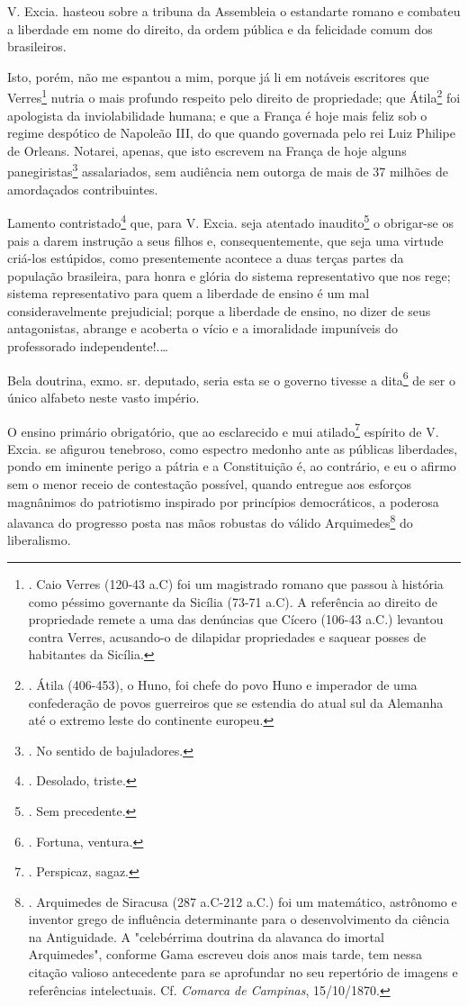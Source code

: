 V. Excia. hasteou sobre a tribuna da Assembleia o estandarte romano e
combateu a liberdade em nome do direito, da ordem pública e da
felicidade comum dos brasileiros.

Isto, porém, não me espantou a mim, porque já li em notáveis escritores
que Verres\footnote{. Caio Verres (120-43 a.C) foi um magistrado romano
  que passou à história como péssimo governante da Sicília (73-71 a.C).
  A referência ao direito de propriedade remete a uma das denúncias que
  Cícero (106-43 a.C.) levantou contra Verres, acusando-o de dilapidar
  propriedades e saquear posses de habitantes da Sicília.} nutria o mais
profundo respeito pelo direito de propriedade; que Átila\footnote{.
  Átila (406-453), o Huno, foi chefe do povo Huno e imperador de uma
  confederação de povos guerreiros que se estendia do atual sul da
  Alemanha até o extremo leste do continente europeu.} foi apologista da
inviolabilidade humana; e que a França é hoje mais feliz sob o regime
despótico de Napoleão III, do que quando governada pelo rei Luiz Philipe
de Orleans. Notarei, apenas, que isto escrevem na França de hoje alguns
panegiristas\footnote{. No sentido de bajuladores.} assalariados, sem
audiência nem outorga de mais de 37 milhões de amordaçados
contribuintes.

Lamento contristado\footnote{. Desolado, triste.} que, para V. Excia.
seja atentado inaudito\footnote{. Sem precedente.} o obrigar-se os pais
a darem instrução a seus filhos e, consequentemente, que seja uma
virtude criá-los estúpidos, como presentemente acontece a duas terças
partes da população brasileira, para honra e glória do sistema
representativo que nos rege; sistema representativo para quem a
liberdade de ensino é um mal consideravelmente prejudicial; porque a
liberdade de ensino, no dizer de seus antagonistas, abrange e acoberta o
vício e a imoralidade impuníveis do professorado independente!.\ldots{}

Bela doutrina, exmo. sr. deputado, seria esta se o governo tivesse a
dita\footnote{. Fortuna, ventura.} de ser o único alfabeto neste vasto
império.

O ensino primário obrigatório, que ao esclarecido e mui
atilado\footnote{. Perspicaz, sagaz.} espírito de V. Excia. se afigurou
tenebroso, como espectro medonho ante as públicas liberdades, pondo em
iminente perigo a pátria e a Constituição é, ao contrário, e eu o afirmo
sem o menor receio de contestação possível, quando entregue aos esforços
magnânimos do patriotismo inspirado por princípios democráticos, a
poderosa alavanca do progresso posta nas mãos robustas do válido
Arquimedes\footnote{. Arquimedes de Siracusa (287 a.C-212 a.C.) foi um
  matemático, astrônomo e inventor grego de influência determinante para
  o desenvolvimento da ciência na Antiguidade. A "celebérrima doutrina
  da alavanca do imortal Arquimedes", conforme Gama escreveu dois anos
  mais tarde, tem nessa citação valioso antecedente para se aprofundar
  no seu repertório de imagens e referências intelectuais. Cf.
  \emph{Comarca de Campinas}, 15/10/1870.} do liberalismo.

